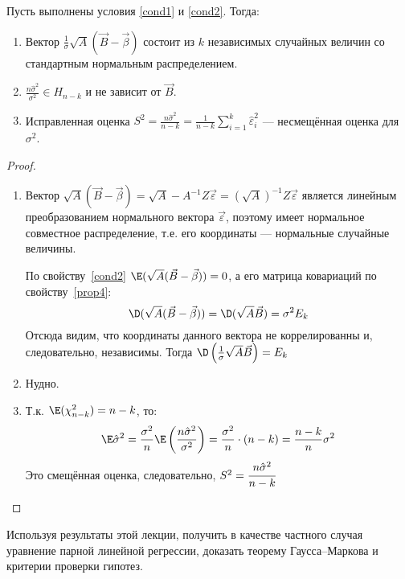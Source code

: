 \begin{theorem}
    Пусть выполнены условия \ref{cond1} и \ref{cond2}. Тогда:
    \begin{enumerate}
        \item Вектор \(\frac{1}{\sigma}\sqrt{A}(\vec{B} - \vec{\beta})\) состоит из \(k\) независимых случайных величин со стандартным нормальным распределением.
        \item \(\frac{n \hat{\sigma}^2}{\sigma^2} \in H_{n - k}\) и не зависит от \(\vec{B}\).
        \item Исправленная оценка \(S^2 = \frac{n \hat{\sigma}^2}{n - k} = \frac{1}{n - k} \sum_{i=1}^{k} \hat{\varepsilon}_i^2\) --- несмещённая оценка для \(\sigma^2\).
    \end{enumerate}
\end{theorem}
\begin{proof}\itemfix
    \begin{enumerate}
        \item Вектор \(\sqrt{A}(\vec{B} - \vec{\beta}) = \sqrt{A} - A^{-1} Z \vec{\varepsilon} = (\sqrt{A})^{-1} Z \vec{\varepsilon}\) является линейным преобразованием нормального вектора \(\vec{\varepsilon}\), поэтому имеет нормальное совместное распределение, т.е. его координаты --- нормальные случайные величины.

              По свойству~\ref{cond2} \(\E(\sqrt{A} (\vec{B} - \vec{\beta})) = 0\), а его матрица ковариаций по свойству~\ref{prop4}:
              \[\D(\sqrt{A} (\vec{B} - \vec{\beta})) = \D (\sqrt{A} \vec{B}) = \sigma^2 E_k\]
              Отсюда видим, что координаты данного вектора не коррелированны и, следовательно, независимы. Тогда \(\D\left(\frac{1}{\sigma}\sqrt{A} \vec{B}\right) = E_k\)
        \item Нудно.
        \item Т.к. \(\E(\chi^2_{n - k}) = n - k\), то:
              \[\E \hat{\sigma}^2 = \frac{\sigma^2}{n} \E \left(\frac{n \hat{\sigma}^2}{\sigma^2}\right) = \frac{\sigma^2}{n} \cdot (n - k) = \frac{n - k}{n}\sigma^2\]
              Это смещённая оценка, следовательно, \(S^2 = \cfrac{n \hat{\sigma}^2}{n - k}\)
    \end{enumerate}
\end{proof}

\begin{exercise}
    Используя результаты этой лекции, получить в качестве частного случая уравнение парной линейной регрессии, доказать теорему Гаусса--Маркова и критерии проверки гипотез.
\end{exercise}
